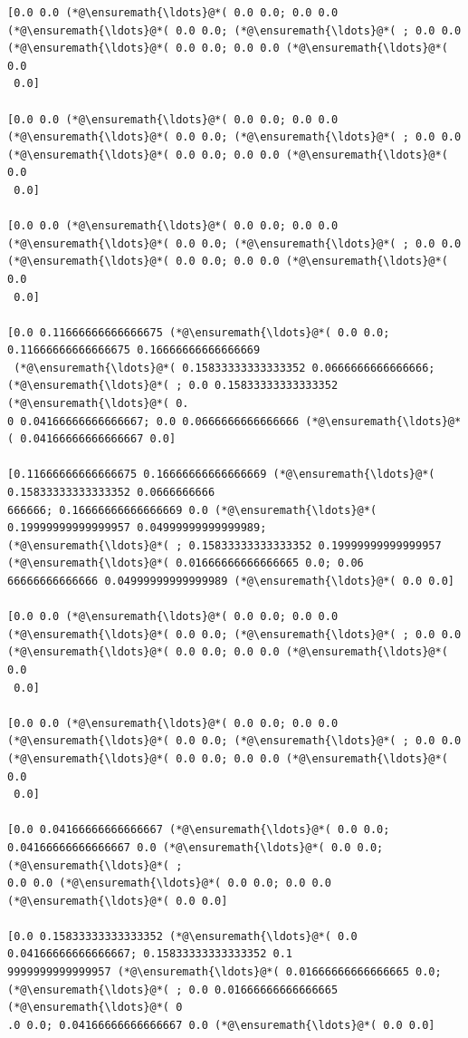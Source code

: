 \documentclass[12pt,a4paper]{article}
\begin{document}
\begin{lstlisting}
[0.0 0.0 (*@\ensuremath{\ldots}@*( 0.0 0.0; 0.0 0.0 (*@\ensuremath{\ldots}@*( 0.0 0.0; (*@\ensuremath{\ldots}@*( ; 0.0 0.0 (*@\ensuremath{\ldots}@*( 0.0 0.0; 0.0 0.0 (*@\ensuremath{\ldots}@*( 0.0
 0.0]

[0.0 0.0 (*@\ensuremath{\ldots}@*( 0.0 0.0; 0.0 0.0 (*@\ensuremath{\ldots}@*( 0.0 0.0; (*@\ensuremath{\ldots}@*( ; 0.0 0.0 (*@\ensuremath{\ldots}@*( 0.0 0.0; 0.0 0.0 (*@\ensuremath{\ldots}@*( 0.0
 0.0]

[0.0 0.0 (*@\ensuremath{\ldots}@*( 0.0 0.0; 0.0 0.0 (*@\ensuremath{\ldots}@*( 0.0 0.0; (*@\ensuremath{\ldots}@*( ; 0.0 0.0 (*@\ensuremath{\ldots}@*( 0.0 0.0; 0.0 0.0 (*@\ensuremath{\ldots}@*( 0.0
 0.0]

[0.0 0.11666666666666675 (*@\ensuremath{\ldots}@*( 0.0 0.0; 0.11666666666666675 0.16666666666666669
 (*@\ensuremath{\ldots}@*( 0.15833333333333352 0.0666666666666666; (*@\ensuremath{\ldots}@*( ; 0.0 0.15833333333333352 (*@\ensuremath{\ldots}@*( 0.
0 0.04166666666666667; 0.0 0.0666666666666666 (*@\ensuremath{\ldots}@*( 0.04166666666666667 0.0]

[0.11666666666666675 0.16666666666666669 (*@\ensuremath{\ldots}@*( 0.15833333333333352 0.0666666666
666666; 0.16666666666666669 0.0 (*@\ensuremath{\ldots}@*( 0.19999999999999957 0.04999999999999989; 
(*@\ensuremath{\ldots}@*( ; 0.15833333333333352 0.19999999999999957 (*@\ensuremath{\ldots}@*( 0.01666666666666665 0.0; 0.06
66666666666666 0.04999999999999989 (*@\ensuremath{\ldots}@*( 0.0 0.0]

[0.0 0.0 (*@\ensuremath{\ldots}@*( 0.0 0.0; 0.0 0.0 (*@\ensuremath{\ldots}@*( 0.0 0.0; (*@\ensuremath{\ldots}@*( ; 0.0 0.0 (*@\ensuremath{\ldots}@*( 0.0 0.0; 0.0 0.0 (*@\ensuremath{\ldots}@*( 0.0
 0.0]

[0.0 0.0 (*@\ensuremath{\ldots}@*( 0.0 0.0; 0.0 0.0 (*@\ensuremath{\ldots}@*( 0.0 0.0; (*@\ensuremath{\ldots}@*( ; 0.0 0.0 (*@\ensuremath{\ldots}@*( 0.0 0.0; 0.0 0.0 (*@\ensuremath{\ldots}@*( 0.0
 0.0]

[0.0 0.04166666666666667 (*@\ensuremath{\ldots}@*( 0.0 0.0; 0.04166666666666667 0.0 (*@\ensuremath{\ldots}@*( 0.0 0.0; (*@\ensuremath{\ldots}@*( ; 
0.0 0.0 (*@\ensuremath{\ldots}@*( 0.0 0.0; 0.0 0.0 (*@\ensuremath{\ldots}@*( 0.0 0.0]

[0.0 0.15833333333333352 (*@\ensuremath{\ldots}@*( 0.0 0.04166666666666667; 0.15833333333333352 0.1
9999999999999957 (*@\ensuremath{\ldots}@*( 0.01666666666666665 0.0; (*@\ensuremath{\ldots}@*( ; 0.0 0.01666666666666665 (*@\ensuremath{\ldots}@*( 0
.0 0.0; 0.04166666666666667 0.0 (*@\ensuremath{\ldots}@*( 0.0 0.0]


\end{lstlisting}
\end{document}
